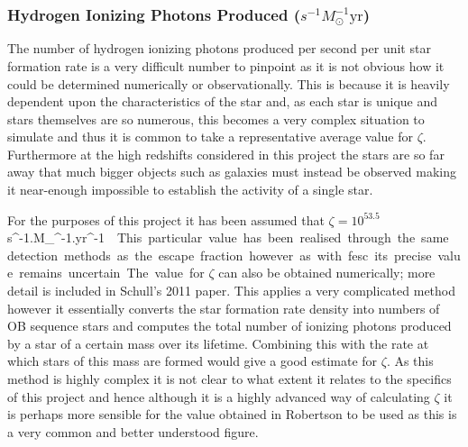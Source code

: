 		\subsubsection{Hydrogen Ionizing Photons Produced ($s^{-1}M_\odot^{-1}\text{yr}$)} %
		\label{sub:hydrogen_ionizing_photons_produced_per_second_per_unit_star_formation_rate}
			The number of hydrogen ionizing photons produced per second per unit star formation rate is a very difficult number to pinpoint as it is not obvious how it could be determined numerically or observationally. This is because it is heavily dependent upon the characteristics of the star and, as each star is unique and stars themselves are so numerous, this becomes a very complex situation to simulate and thus it is common to take a representative average value for $\zeta$. Furthermore at the high redshifts considered in this project the stars are so far away that much bigger objects such as galaxies must instead be observed making it near-enough impossible to establish the activity of a single star.

			For the purposes of this project it has been assumed that $\zeta=10^{53.5}$\si{s^{-1}.M_{\odot}^{-1}.yr^{-1}}\cite{robertson2010early}. This particular value has been realised through the same detection methods as the escape fraction however as with fesc its precise value remains uncertain.

			The value for $\zeta$ can also be obtained numerically; more detail is included in Schull's 2011 paper\cite{shull2012critical}. This applies a very complicated method however it essentially converts the star formation rate density into numbers of OB sequence stars and computes the total number of ionizing photons produced by a star of a certain mass over its lifetime. Combining this with the rate at which stars of this mass are formed would give a good estimate for $\zeta$. As this method is highly complex it is not clear to what extent it relates to the specifics of this project and hence although it is a highly advanced way of calculating $\zeta$ it is perhaps more sensible for the value obtained in Robertson to be used as this is a very common and better understood figure.

